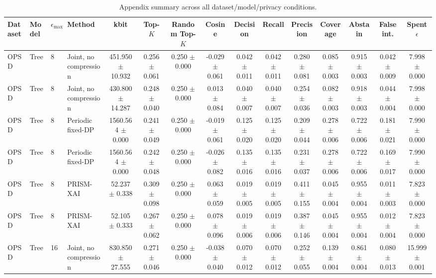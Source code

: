 \begin{table}[t]
\caption{Appendix summary across all dataset/model/privacy conditions.}
\label{tab:appendix-conditions}
\centering
\scriptsize
\setlength{\tabcolsep}{2.5pt}
\begin{tabular}{llllccccccccccc}
\toprule
Dataset & Model & $\epsilon_{\max}$ & Method & kbit & Top-$K$ & Random Top-$K$ & Cosine & Decision & Recall & Precision & Coverage & Abstain & False int. & Spent $\epsilon$ \\
\midrule
OPSD & Tree & 8 & Joint, no compression & 451.950 $\pm$ 10.932 & 0.256 $\pm$ 0.061 & 0.250 $\pm$ 0.000 & -0.029 $\pm$ 0.061 & 0.042 $\pm$ 0.011 & 0.042 $\pm$ 0.011 & 0.280 $\pm$ 0.081 & 0.085 $\pm$ 0.003 & 0.915 $\pm$ 0.003 & 0.042 $\pm$ 0.009 & 7.998 $\pm$ 0.000 \\
OPSD & Tree & 8 & Joint, no compression & 430.800 $\pm$ 14.287 & 0.248 $\pm$ 0.040 & 0.250 $\pm$ 0.000 & 0.013 $\pm$ 0.084 & 0.040 $\pm$ 0.007 & 0.040 $\pm$ 0.007 & 0.254 $\pm$ 0.036 & 0.082 $\pm$ 0.003 & 0.918 $\pm$ 0.003 & 0.044 $\pm$ 0.004 & 7.998 $\pm$ 0.000 \\
OPSD & Tree & 8 & Periodic fixed-DP & 1560.564 $\pm$ 0.000 & 0.241 $\pm$ 0.049 & 0.250 $\pm$ 0.000 & -0.019 $\pm$ 0.061 & 0.125 $\pm$ 0.020 & 0.125 $\pm$ 0.020 & 0.209 $\pm$ 0.044 & 0.278 $\pm$ 0.006 & 0.722 $\pm$ 0.006 & 0.181 $\pm$ 0.021 & 7.990 $\pm$ 0.000 \\
OPSD & Tree & 8 & Periodic fixed-DP & 1560.564 $\pm$ 0.000 & 0.242 $\pm$ 0.048 & 0.250 $\pm$ 0.000 & -0.026 $\pm$ 0.082 & 0.135 $\pm$ 0.016 & 0.135 $\pm$ 0.016 & 0.231 $\pm$ 0.037 & 0.278 $\pm$ 0.006 & 0.722 $\pm$ 0.006 & 0.169 $\pm$ 0.017 & 7.990 $\pm$ 0.000 \\
OPSD & Tree & 8 & PRISM-XAI & 52.237 $\pm$ 0.338 & 0.309 $\pm$ 0.098 & 0.250 $\pm$ 0.000 & 0.063 $\pm$ 0.059 & 0.019 $\pm$ 0.005 & 0.019 $\pm$ 0.005 & 0.411 $\pm$ 0.155 & 0.045 $\pm$ 0.004 & 0.955 $\pm$ 0.004 & 0.011 $\pm$ 0.003 & 7.823 $\pm$ 0.000 \\
OPSD & Tree & 8 & PRISM-XAI & 52.105 $\pm$ 0.333 & 0.267 $\pm$ 0.062 & 0.250 $\pm$ 0.000 & 0.078 $\pm$ 0.096 & 0.019 $\pm$ 0.006 & 0.019 $\pm$ 0.006 & 0.387 $\pm$ 0.146 & 0.045 $\pm$ 0.004 & 0.955 $\pm$ 0.004 & 0.012 $\pm$ 0.004 & 7.823 $\pm$ 0.000 \\
OPSD & Tree & 16 & Joint, no compression & 830.850 $\pm$ 27.555 & 0.271 $\pm$ 0.046 & 0.250 $\pm$ 0.000 & -0.038 $\pm$ 0.040 & 0.070 $\pm$ 0.012 & 0.070 $\pm$ 0.012 & 0.252 $\pm$ 0.055 & 0.139 $\pm$ 0.004 & 0.861 $\pm$ 0.004 & 0.080 $\pm$ 0.013 & 15.999 $\pm$ 0.001 \\

\end{tabular}
\end{table}
